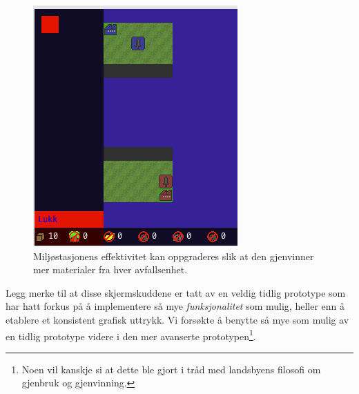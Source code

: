 \begin{figure}
\centering
\includegraphics[scale=0.7]{images/OppgradereEnv.png}
\caption{Miljøstasjonens effektivitet kan oppgraderes slik at den gjenvinner mer materialer fra hver avfallsenhet.}
\label{fig:OppgradereEnv}
\end{figure}



Legg merke til at disse skjermskuddene er tatt av en veldig tidlig prototype som har hatt forkus på å implementere så mye \emph{funksjonalitet} som mulig, heller enn å etablere et konsistent grafisk uttrykk. Vi forsøkte å benytte så mye som mulig av en tidlig prototype videre i den mer avanserte prototypen\footnote{Noen vil kanskje si at dette ble gjort i tråd med landsbyens filosofi om gjenbruk og gjenvinning.}.
